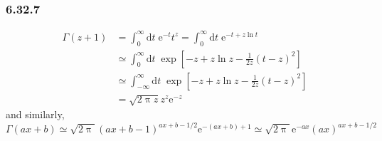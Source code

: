 \documentclass[]{ctexart}
\begin{document}
	\subsubsection*{6.32.7}
	\begin{equation*}
	\begin{split}
	\Gamma(z+1)&=\int_0^\infty\mathrm{d}t\;\mathrm{e}^{-t}t^z=\int_0^\infty\mathrm{d}t\;\mathrm{e}^{-t+z\ln t}\\
	&\simeq\int_0^\infty\mathrm{d}t\;\exp\left[-z+z\ln z-\frac 1{2z}(t-z)^2\right]\\
	&\simeq\int_{-\infty}^\infty\mathrm{d}t\;\exp\left[-z+z\ln z-\frac 1{2z}(t-z)^2\right]\\
	&=\sqrt{2\uppi z}z^z\mathrm{e}^{-z}
	\end{split}
	\end{equation*}
	and similarly, 
	\begin{equation*}
	\Gamma(ax+b)\simeq\sqrt{2\uppi}(ax+b-1)^{ax+b-1/2}\mathrm{e}^{-(ax+b)+1}\simeq\sqrt{2\uppi}\mathrm{e}^{-ax}(ax)^{ax+b-1/2}
	\end{equation*}
\end{document}
